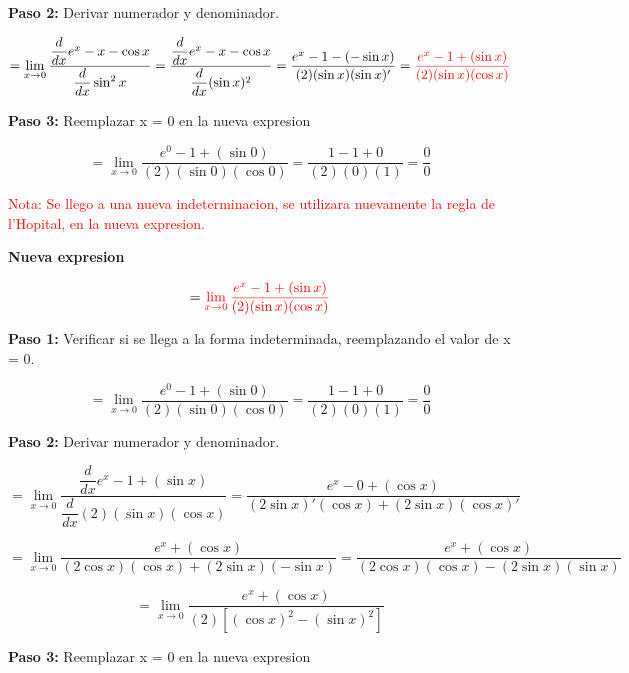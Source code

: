 \documentclass[12pt,a4paper]{article}
\begin{document}
\textbf{Paso 2:}
\vspace{0.2cm}
Derivar numerador y denominador.

\[
= \lim_{x \to 0} \frac{\dfrac{d}{dx} e^x -x - \cos x}{\dfrac{d}{dx} \sin^{2} x}= \frac{\dfrac{d}{dx} e^x -x - \cos x}{\dfrac{d}{dx} (\sin x)^2} = \frac{e^x -1 - (-\sin x)}{(2)(\sin x)(\sin x)'}= \textcolor{red}{\frac{e^x -1 + (\sin x)}{(2)(\sin x)(\cos x)}}
\]


\vspace{0.2cm}



\textbf{Paso 3:}
\vspace{0.2cm}
Reemplazar x = 0 en la nueva expresion

\[
= \lim_{x \to 0} \frac{e^0 -1 + (\sin 0)}{(2)(\sin 0)(\cos 0)}= \frac{1-1+0}{(2)(0)(1)} = \frac{0}{0} 
\]



\textcolor{red}{Nota: Se llego a una nueva indeterminacion, se utilizara nuevamente la regla de l'Hopital, en la nueva expresion.}

\vspace{0.2cm}

\textbf{Nueva expresion}

\[
= \textcolor{red}{\lim_{x \to 0} \frac{e^x -1 + (\sin x)}{(2)(\sin x)(\cos x)}}
\]


\textbf{Paso 1:}
\vspace{0.2cm}
Verificar si se llega a la forma indeterminada, reemplazando el valor de x = 0.

\[
= \lim_{x \to 0} \frac{e^0 -1 + (\sin 0)}{(2)(\sin 0)(\cos 0)}= \frac{1-1+0}{(2)(0)(1)} = \frac{0}{0} 
\]


\newpage

\textbf{Paso 2:}
\vspace{0.2cm}
Derivar numerador y denominador.

\[
= \lim_{x \to 0} \frac{\dfrac{d}{dx} e^x -1 + (\sin x)}{\dfrac{d}{dx} (2)(\sin x)(\cos x)}=  \frac{e^x -0 + (\cos x)}{(2 \sin x)'(\cos x)+ (2 \sin x)(\cos x)'}
\]

\[
= \lim_{x \to 0} \frac{e^x + (\cos x)}{(2 \cos x)(\cos x)+ (2 \sin x)(-\sin x)} = \frac{e^x + (\cos x)}{(2 \cos x)(\cos x)- (2 \sin x)(\sin x)} 
\]

\[
= \lim_{x \to 0} \frac{e^x + (\cos x)}{(2)[(\cos x)^2- (\sin x)^2]}
\]


\textbf{Paso 3:}
\vspace{0.2cm}
Reemplazar x = 0 en la nueva expresion
\end{document}
